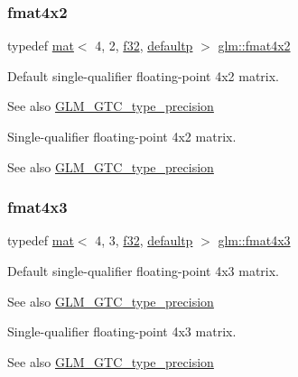 \subsubsection{\texorpdfstring{fmat4x2}{fmat4x2}}
{\footnotesize\ttfamily typedef \hyperlink{structglm_1_1mat}{mat}$<$ 4, 2, \hyperlink{group__gtc__type__precision_ga0ec999b57f5330d9021256e96038df04}{f32}, \hyperlink{namespaceglm_a36ed105b07c7746804d7fdc7cc90ff25a9d21ccd8b5a009ec7eb7677befc3bf51}{defaultp} $>$ \hyperlink{group__gtc__type__precision_ga279cf309f0098c3d26ce88fe8a26375a}{glm\+::fmat4x2}}

Default single-\/qualifier floating-\/point 4x2 matrix. \begin{DoxySeeAlso}{See also}
\hyperlink{group__gtc__type__precision}{G\+L\+M\+\_\+\+G\+T\+C\+\_\+type\+\_\+precision}
\end{DoxySeeAlso}
Single-\/qualifier floating-\/point 4x2 matrix. \begin{DoxySeeAlso}{See also}
\hyperlink{group__gtc__type__precision}{G\+L\+M\+\_\+\+G\+T\+C\+\_\+type\+\_\+precision} 
\end{DoxySeeAlso}
\mbox{\label{group__gtc__type__precision_ga0ab797a258612fe48345951a0bdd6b8c}} 
\subsubsection{\texorpdfstring{fmat4x3}{fmat4x3}}
{\footnotesize\ttfamily typedef \hyperlink{structglm_1_1mat}{mat}$<$ 4, 3, \hyperlink{group__gtc__type__precision_ga0ec999b57f5330d9021256e96038df04}{f32}, \hyperlink{namespaceglm_a36ed105b07c7746804d7fdc7cc90ff25a9d21ccd8b5a009ec7eb7677befc3bf51}{defaultp} $>$ \hyperlink{group__gtc__type__precision_ga0ab797a258612fe48345951a0bdd6b8c}{glm\+::fmat4x3}}

Default single-\/qualifier floating-\/point 4x3 matrix. \begin{DoxySeeAlso}{See also}
\hyperlink{group__gtc__type__precision}{G\+L\+M\+\_\+\+G\+T\+C\+\_\+type\+\_\+precision}
\end{DoxySeeAlso}
Single-\/qualifier floating-\/point 4x3 matrix. \begin{DoxySeeAlso}{See also}
\hyperlink{group__gtc__type__precision}{G\+L\+M\+\_\+\+G\+T\+C\+\_\+type\+\_\+precision} 
\end{DoxySeeAlso}
\mbox{\label{group__gtc__type__precision_gaeda4baa9a8e3113ff879dd5e7bdf5334}} 
